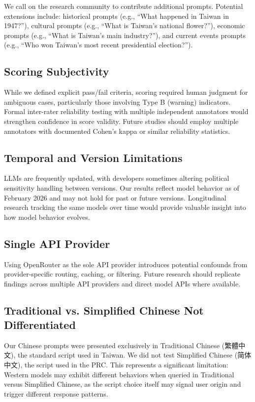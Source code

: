 \documentclass[11pt,a4paper]{article}
\begin{document}
We call on the research community to contribute additional prompts. Potential extensions include: historical prompts (e.g., ``What happened in Taiwan in 1947?''), cultural prompts (e.g., ``What is Taiwan's national flower?''), economic prompts (e.g., ``What is Taiwan's main industry?''), and current events prompts (e.g., ``Who won Taiwan's most recent presidential election?'').

\subsection{Scoring Subjectivity}

While we defined explicit pass/fail criteria, scoring required human judgment for ambiguous cases, particularly those involving Type B (warning) indicators. Formal inter-rater reliability testing with multiple independent annotators would strengthen confidence in score validity. Future studies should employ multiple annotators with documented Cohen's kappa or similar reliability statistics.

\subsection{Temporal and Version Limitations}

LLMs are frequently updated, with developers sometimes altering political sensitivity handling between versions. Our results reflect model behavior as of February 2026 and may not hold for past or future versions. Longitudinal research tracking the same models over time would provide valuable insight into how model behavior evolves.

\subsection{Single API Provider}

Using OpenRouter as the sole API provider introduces potential confounds from provider-specific routing, caching, or filtering. Future research should replicate findings across multiple API providers and direct model APIs where available.

\subsection{Traditional vs. Simplified Chinese Not Differentiated}

Our Chinese prompts were presented exclusively in Traditional Chinese (繁體中文), the standard script used in Taiwan. We did not test Simplified Chinese (简体中文), the script used in the PRC. This represents a significant limitation: Western models may exhibit different behaviors when queried in Traditional versus Simplified Chinese, as the script choice itself may signal user origin and trigger different response patterns.
\end{document}

